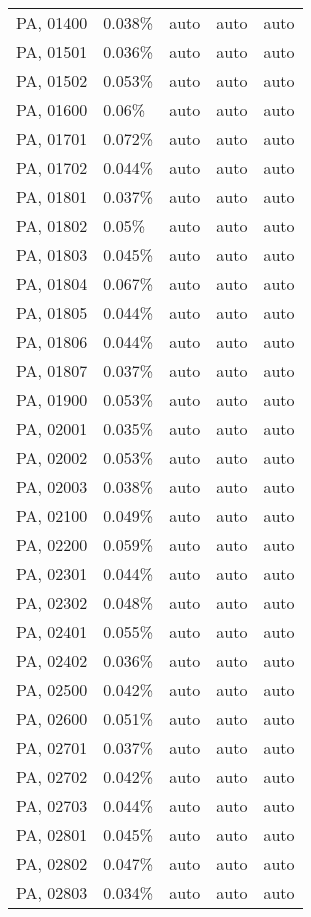 \begin{longtable}[]{@{}lllll@{}}
PA, 01400 & 0.038\% & auto & auto & auto \\
PA, 01501 & 0.036\% & auto & auto & auto \\
PA, 01502 & 0.053\% & auto & auto & auto \\
PA, 01600 & 0.06\% & auto & auto & auto \\
PA, 01701 & 0.072\% & auto & auto & auto \\
PA, 01702 & 0.044\% & auto & auto & auto \\
PA, 01801 & 0.037\% & auto & auto & auto \\
PA, 01802 & 0.05\% & auto & auto & auto \\
PA, 01803 & 0.045\% & auto & auto & auto \\
PA, 01804 & 0.067\% & auto & auto & auto \\
PA, 01805 & 0.044\% & auto & auto & auto \\
PA, 01806 & 0.044\% & auto & auto & auto \\
PA, 01807 & 0.037\% & auto & auto & auto \\
PA, 01900 & 0.053\% & auto & auto & auto \\
PA, 02001 & 0.035\% & auto & auto & auto \\
PA, 02002 & 0.053\% & auto & auto & auto \\
PA, 02003 & 0.038\% & auto & auto & auto \\
PA, 02100 & 0.049\% & auto & auto & auto \\
PA, 02200 & 0.059\% & auto & auto & auto \\
PA, 02301 & 0.044\% & auto & auto & auto \\
PA, 02302 & 0.048\% & auto & auto & auto \\
PA, 02401 & 0.055\% & auto & auto & auto \\
PA, 02402 & 0.036\% & auto & auto & auto \\
PA, 02500 & 0.042\% & auto & auto & auto \\
PA, 02600 & 0.051\% & auto & auto & auto \\
PA, 02701 & 0.037\% & auto & auto & auto \\
PA, 02702 & 0.042\% & auto & auto & auto \\
PA, 02703 & 0.044\% & auto & auto & auto \\
PA, 02801 & 0.045\% & auto & auto & auto \\
PA, 02802 & 0.047\% & auto & auto & auto \\
PA, 02803 & 0.034\% & auto & auto & auto \\

\end{longtable}
